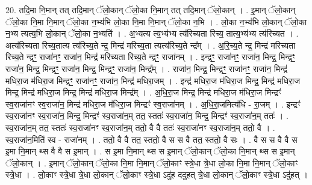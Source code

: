 \documentclass[17pt]{extarticle}
\begin{document}
20. तदि॒मा नि॒मान् तत् तदि॒मान् ॅलो॒कान् ॅलो॒का नि॒मान् तत् तदि॒मान् ॅलो॒कान् । . इ॒मान् ॅलो॒कान् ॅलो॒का नि॒मा नि॒मान् ॅलो॒का न॒भ्य॑भि लो॒का नि॒मा नि॒मान् ॅलो॒का न॒भि । . लो॒का न॒भ्य॑भि लो॒कान् ॅलो॒का न॒भ्य त्यत्य॒भि लो॒कान् ॅलो॒का न॒भ्यति॑ । . अ॒भ्यत्य त्य॒भ्य॑भ्य त्य॑रिच्यता रिच्य॒ तात्य॒भ्य॑भ्य त्य॑रिच्यत । . अत्य॑रिच्यता रिच्य॒तात्य त्य॑रिच्य॒ते न्द्र॒ मिन्द्र॑ मरिच्य॒ता त्यत्य॑रिच्य॒ते न्द्र᳚म् । . अ॒रि॒च्य॒ते न्द्र॒ मिन्द्र॑ मरिच्यता रिच्य॒ते न्द्रꣳ॒॒ राजा॑नꣳ॒॒ राजा॑न॒ मिन्द्र॑ मरिच्यता रिच्य॒ते न्द्रꣳ॒॒ राजा॑नम् । . इन्द्रꣳ॒॒ राजा॑नꣳ॒॒ राजा॑न॒ मिन्द्र॒ मिन्द्रꣳ॒॒ राजा॑न॒ मिन्द्र॒ मिन्द्रꣳ॒॒ राजा॑न॒ मिन्द्र॒ मिन्द्रꣳ॒॒ राजा॑न॒ मिन्द्र᳚म् । . राजा॑न॒ मिन्द्र॒ मिन्द्रꣳ॒॒ राजा॑नꣳ॒॒ राजा॑न॒ मिन्द्र॑ मधिरा॒ज म॑धिरा॒ज मिन्द्रꣳ॒॒ राजा॑नꣳ॒॒ राजा॑न॒ मिन्द्र॑ मधिरा॒जम् । . इन्द्र॑ मधिरा॒ज म॑धिरा॒ज मिन्द्र॒ मिन्द्र॑ मधिरा॒ज मिन्द्र॒ मिन्द्र॑ मधिरा॒ज मिन्द्र॒ मिन्द्र॑ मधिरा॒ज मिन्द्र᳚म् । . अ॒धि॒रा॒ज मिन्द्र॒ मिन्द्र॑ मधिरा॒ज म॑धिरा॒ज मिन्द्रꣳ॑ स्व॒राजा॑नꣳ स्व॒राजा॑न॒ मिन्द्र॑ मधिरा॒ज म॑धिरा॒ज मिन्द्रꣳ॑ स्व॒राजा॑नम् । . अ॒धि॒रा॒जमित्य॑धि - रा॒जम् । . इन्द्रꣳ॑ स्व॒राजा॑नꣳ स्व॒राजा॑न॒ मिन्द्र॒ मिन्द्रꣳ॑ स्व॒राजा॑न॒म् तत॒ स्ततः॑ स्व॒राजा॑न॒ मिन्द्र॒ मिन्द्रꣳ॑ स्व॒राजा॑न॒म् ततः॑ । . स्व॒राजा॑न॒म् तत॒ स्ततः॑ स्व॒राजा॑नꣳ स्व॒राजा॑न॒म् ततो॒ वै वै ततः॑ स्व॒राजा॑नꣳ स्व॒राजा॑न॒म् ततो॒ वै । . स्व॒राजा॑न॒मिति॑ स्व - राजा॑नम् । . ततो॒ वै वै तत॒ स्ततो॒ वै स स वै तत॒ स्ततो॒ वै सः । . वै स स वै वै स इ॒मा नि॒मान् थ्स वै वै स इ॒मान् । . स इ॒मा नि॒मान् थ्स स इ॒मान् ॅलो॒कान् ॅलो॒का नि॒मान् थ्स स इ॒मान् ॅलो॒कान् । . इ॒मान् ॅलो॒कान् ॅलो॒का नि॒मा नि॒मान् ॅलो॒काꣳ स्त्रे॒धा त्रे॒धा लो॒का नि॒मा नि॒मान् ॅलो॒काꣳ स्त्रे॒धा । . लो॒काꣳ स्त्रे॒धा त्रे॒धा लो॒कान् ॅलो॒काꣳ स्त्रे॒धा ऽदु॑ह ददुहत् त्रे॒धा लो॒कान् ॅलो॒काꣳ स्त्रे॒धा ऽदु॑हत् । \newline
\end{document}
